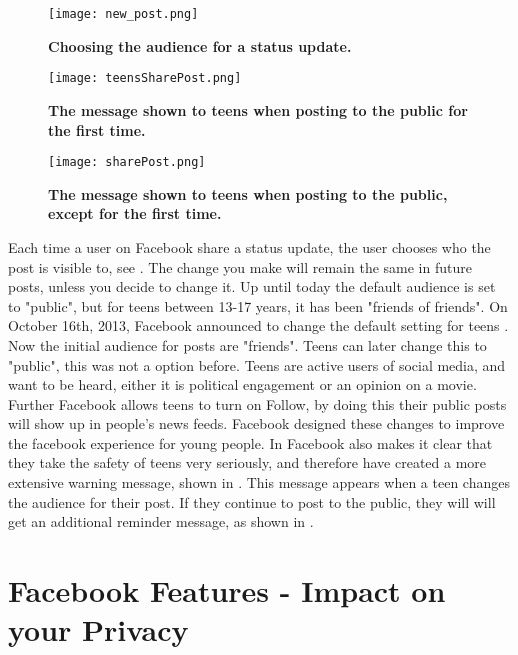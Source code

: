 \begin{figure}[t]
\centering
\texttt{[image: new\_post.png]}
\caption[Choosing who can see a status update.]{\textbf{Choosing the audience for a status update.}}
\label{fig:newPost}
\end{figure}

\begin{figure}[b]
\centering
\texttt{[image: teensSharePost.png]}
\caption[The message shown to teens when posting to the public for the first time]{\textbf{The message shown to teens when posting to the public for the first time.}} 
\label{fig:teensSharePost}
\end{figure}

\begin{figure}[t]
\centering
\texttt{[image: sharePost.png]}
\caption [The message shown to teens when posting to the public, except for the first time]{\textbf{The message shown to teens when posting to the public, except for the first time.}} 
\label{fig:sharePost}
\end{figure}

Each time a user on Facebook share a status update, the user chooses who the post is visible to, see . The change you make will remain the same in future posts, unless you decide to change it. Up until today the default audience is set to "public", but for teens between 13-17 years, it has been "friends of friends". On October 16th, 2013, Facebook announced to change the default setting for teens \cite{defaultTeens}. Now the initial audience for posts are "friends". Teens can later change this to "public", this was not a option before. Teens are active users of social media, and want to be heard, either it is political engagement or an opinion on a movie. Further Facebook allows teens to turn on Follow, by doing this their public posts will show up in people's news feeds. Facebook designed these changes to improve the facebook experience for young people. In \cite{defaultTeens} Facebook also makes it clear that they take the safety of teens very seriously, and therefore have created a more extensive warning message, shown in  . This message appears when a teen changes the audience for their post. If they continue to post to the public, they will will get an additional reminder message, as shown in  .

\section{Facebook Features - Impact on your Privacy}\label{sec:facebook_features}

